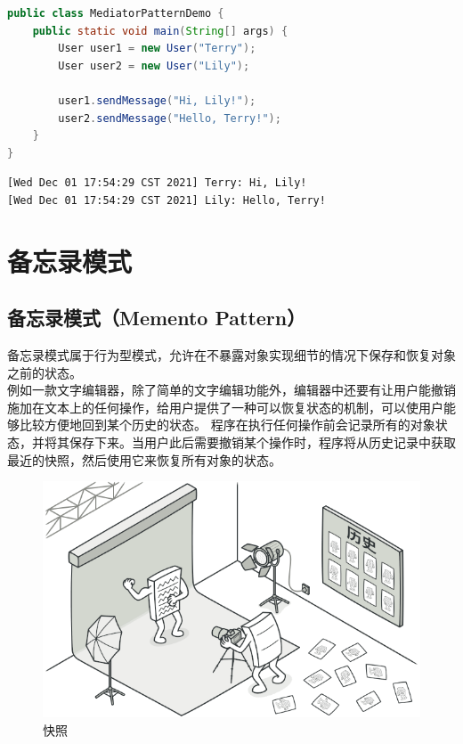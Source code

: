 \begin{lstlisting}[language=Java, title=MediatorPatternDemo.java]
public class MediatorPatternDemo {
    public static void main(String[] args) {
        User user1 = new User("Terry");
        User user2 = new User("Lily");

        user1.sendMessage("Hi, Lily!");
        user2.sendMessage("Hello, Terry!");
    }
}
\end{lstlisting}

\begin{tcolorbox}
    \begin{verbatim}
[Wed Dec 01 17:54:29 CST 2021] Terry: Hi, Lily!
[Wed Dec 01 17:54:29 CST 2021] Lily: Hello, Terry!
\end{verbatim}
\end{tcolorbox}

\newpage

\section{备忘录模式}

\subsection{备忘录模式（Memento Pattern）}

备忘录模式属于行为型模式，允许在不暴露对象实现细节的情况下保存和恢复对象之前的状态。\\

例如一款文字编辑器，除了简单的文字编辑功能外，编辑器中还要有让用户能撤销施加在文本上的任何操作，给用户提供了一种可以恢复状态的机制，可以使用户能够比较方便地回到某个历史的状态。 程序在执行任何操作前会记录所有的对象状态，并将其保存下来。当用户此后需要撤销某个操作时，程序将从历史记录中获取最近的快照，然后使用它来恢复所有对象的状态。

\begin{figure}[H]
    \centering
    \includegraphics[scale=0.6]{img/Chapter4/4-20/1.png}
    \caption{快照}
\end{figure}

